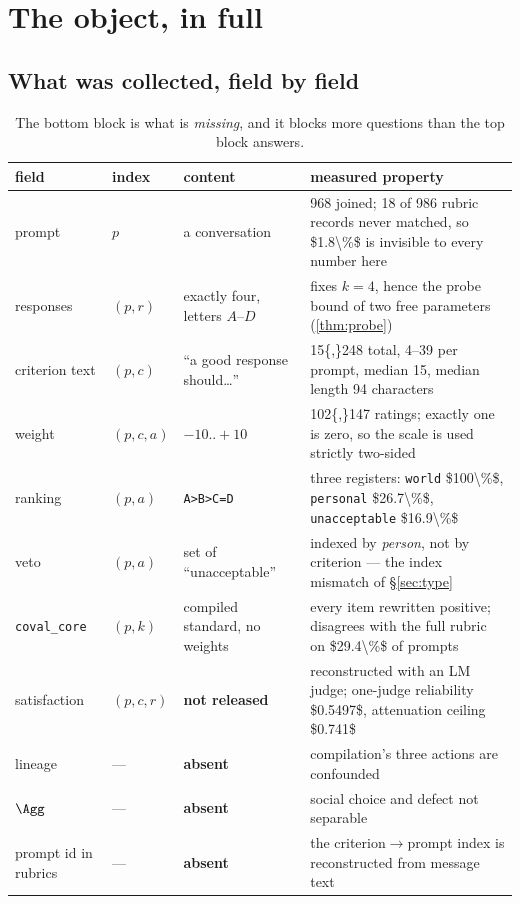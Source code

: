 \section{The object, in full}
\label{sec:coval}

\subsection{What was collected, field by field}

\begin{table}[H]\centering\footnotesize
\begin{tabularx}{\textwidth}{P{2.4cm}P{2.0cm}P{3.4cm}Y}
\toprule
field & index & content & measured property\\
\midrule
prompt & $p$ & a conversation & \num{968} joined; \num{18} of \num{986} rubric
records never matched, so \num{$1.8\%$} is invisible to every number here\\
responses & $(p,r)$ & exactly four, letters $A$--$D$ & fixes $k=4$, hence the
probe bound of two free parameters (\cref{thm:probe})\\
criterion text & $(p,c)$ & ``a good response should\dots'' & \num{15{,}248}
total, \num{4}--\num{39} per prompt, median \num{15}, median length \num{94}
characters\\
weight & $(p,c,a)$ & $-10..{+}10$ & \num{102{,}147} ratings; exactly \num{one} is
zero, so the scale is used strictly two-sided\\
ranking & $(p,a)$ & \texttt{A>B>C=D} & three registers: \texttt{world}
\num{$100\%$}, \texttt{personal} \num{$26.7\%$}, \texttt{unacceptable}
\num{$16.9\%$}\\
veto & $(p,a)$ & set of ``unacceptable'' & indexed by \emph{person}, not by
criterion --- the index mismatch of §\ref{sec:type}\\
\texttt{coval\_core} & $(p,k)$ & compiled standard, no weights & every item
rewritten positive; disagrees with the full rubric on \num{$29.4\%$} of prompts\\
\midrule
satisfaction & $(p,c,r)$ & \textbf{not released} & reconstructed with an LM judge;
one-judge reliability \num{$0.5497$}, attenuation ceiling \num{$0.741$}\\
lineage & --- & \textbf{absent} & compilation's three actions are confounded\\
$\Agg$ & --- & \textbf{absent} & social choice and defect not separable\\
prompt id in rubrics & --- & \textbf{absent} & the criterion$\to$prompt index is
reconstructed from message text\\
\bottomrule
\end{tabularx}
\caption{The bottom block is what is \emph{missing}, and it blocks more questions
than the top block answers.}
\label{tab:fields}
\end{table}

